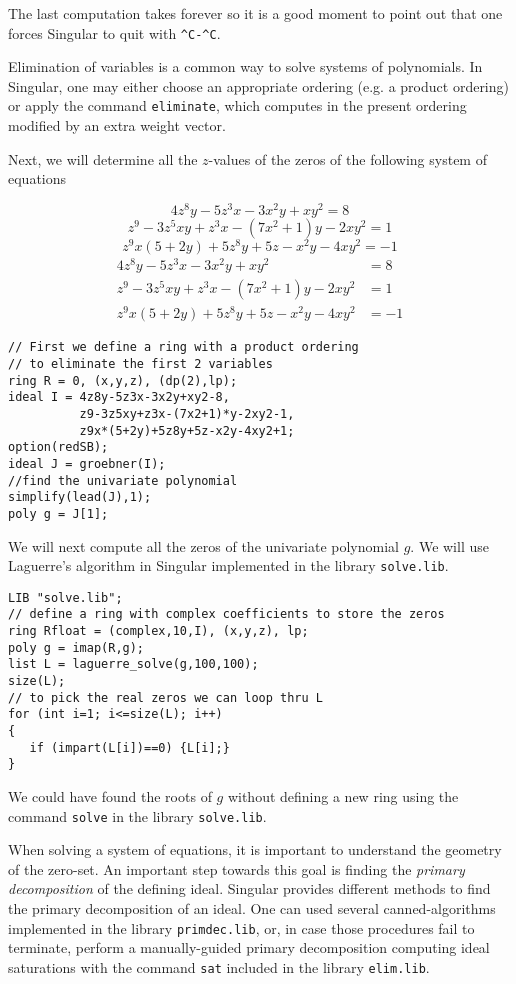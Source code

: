 \documentclass[12pt]{amsart}
\begin{document}
The last computation takes forever so it is a good moment to point out
that one forces Singular to quit with \verb+^C-^C+. 

Elimination of variables is a common way to solve systems of polynomials.
In Singular, one may either choose an appropriate ordering (e.g. a product
ordering) or apply the command \texttt{eliminate}, which computes in the
present ordering modified by an extra weight vector.

Next, we will determine all the $z$-values of the zeros
of the following system of equations

\ifx\shipout\UnDeFiNeD 
$$4z^{8}y - 5z^{3}x - 3x^{2}y + xy^{2} = 8$$
$$z^{9} - 3z^{5}xy+z^{3}x-(7x^{2}+1)y-2xy^{2} = 1$$
$$z^{9}x(5+2y)+5z^{8}y+5z-x^{2}y-4xy^{2} = -1$$
\else 
\begin{align*}
4z^{8}y - 5z^{3}x - 3x^{2}y + xy^{2} &= 8\\
z^{9} - 3z^{5}xy+z^{3}x-(7x^{2}+1)y-2xy^{2} &= 1\\
z^{9}x(5+2y)+5z^{8}y+5z-x^{2}y-4xy^{2} &= -1
\end{align*}
\fi 

\begin{verbatim}
// First we define a ring with a product ordering
// to eliminate the first 2 variables
ring R = 0, (x,y,z), (dp(2),lp);
ideal I = 4z8y-5z3x-3x2y+xy2-8,
          z9-3z5xy+z3x-(7x2+1)*y-2xy2-1,
          z9x*(5+2y)+5z8y+5z-x2y-4xy2+1;
option(redSB);
ideal J = groebner(I);
//find the univariate polynomial
simplify(lead(J),1);
poly g = J[1];
\end{verbatim}

We will next compute all the zeros of the univariate polynomial $g$.
We will use Laguerre's algorithm in Singular implemented in the library
\texttt{solve.lib}.

\begin{verbatim}
LIB "solve.lib";
// define a ring with complex coefficients to store the zeros
ring Rfloat = (complex,10,I), (x,y,z), lp;
poly g = imap(R,g);
list L = laguerre_solve(g,100,100);
size(L);
// to pick the real zeros we can loop thru L
for (int i=1; i<=size(L); i++)
{
   if (impart(L[i])==0) {L[i];}
}
\end{verbatim}

We could have found the roots of $g$ without defining a new ring
using the command \texttt{solve} in the library \texttt{solve.lib}.

When solving a system of equations, it is important to understand the geometry
of the zero-set. An important step towards this goal is finding the \emph{primary decomposition}
of the defining ideal. Singular provides different methods to find the primary decomposition
of an ideal. One can used several canned-algorithms implemented in the library \texttt{primdec.lib},
or, in case those procedures fail to terminate, perform a manually-guided primary decomposition
computing ideal saturations with the command \texttt{sat} included in the library \texttt{elim.lib}.
\end{document}
